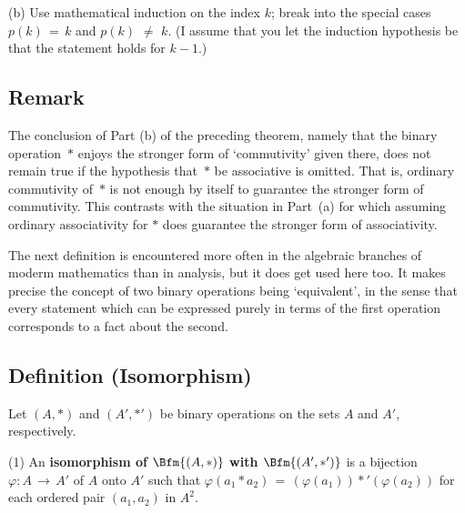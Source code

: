         (b) Use mathematical induction on the index $k$; break into the special cases $p(k) \,=\, k$ and $p(k) \,\,{\neq}\,\, k$.
    (I assume that you let the induction hypothesis be that the statement holds for $k-1$.)

\V

            \subsection{\small{\bf Remark}}
            \label{RemrkA60.60}

        The conclusion of Part (b) of the preceding theorem, namely that the binary operation~${\ast}$ enjoys the stronger form of `commutivity' given there,
    does not remain true if the hypothesis that~${\ast}$ be associative is omitted.
    That is, ordinary commutivity of~${\ast}$ is not enough by itself to guarantee the stronger form of commutivity.
    This contrasts with the situation in Part~(a) for which assuming ordinary associativity for ${\ast}$ does guarantee the stronger form of associativity.


\VV

        The next definition is encountered more often in the algebraic branches of moderm mathematics than in analysis, but it does get used here too.
    It makes precise the concept of two binary operations being `equivalent', in the sense that
    every statement which can be expressed purely in terms of the first operation corresponds to a fact about the second.

\V

            \subsection{\small{\bf Definition} (Isomorphism)}
            \label{DefA60.70}

\V

        Let $(A,{\ast})$ and $(A',{\ast}')$ be binary operations on the sets $A$ and $A'$, respectively.

\V

        (1) An {\bf isomorphism of $\Bfm{(A,{\ast})}$
    with $\Bfm{(A',{\ast}')}$} is a bijection ${\varphi}:A \,{\rightarrow}\, A'$ of $A$ onto $A'$ such that
    ${\varphi}(a_{1}{\ast}a_{2}) \,=\, ({\varphi}(a_{1})){\ast}'({\varphi}(a_{2}))$
    for each ordered pair $(a_{1},a_{2})$ in $A^{2}$.

